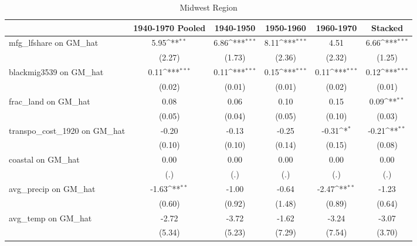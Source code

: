 \begin{table}[htbp]\centering
\def\sym#1{\ifmmode^{#1}\else\(^{#1}\)\fi}
\caption{Midwest Region}
\begin{tabular}{l*{5}{c}}
\toprule
                &\multicolumn{1}{c}{1940-1970 Pooled}&\multicolumn{1}{c}{1940-1950}&\multicolumn{1}{c}{1950-1960}&\multicolumn{1}{c}{1960-1970}&\multicolumn{1}{c}{Stacked}\\
\midrule
mfg\_lfshare on GM\_hat&     5.95\sym{**} &     6.86\sym{***}&     8.11\sym{***}&     4.51         &     6.66\sym{***}\\
                &   (2.27)         &   (1.73)         &   (2.36)         &   (2.32)         &   (1.25)         \\
\addlinespace
blackmig3539 on GM\_hat&     0.11\sym{***}&     0.11\sym{***}&     0.15\sym{***}&     0.11\sym{***}&     0.12\sym{***}\\
                &   (0.02)         &   (0.01)         &   (0.01)         &   (0.02)         &   (0.01)         \\
\addlinespace
frac\_land on GM\_hat&     0.08         &     0.06         &     0.10         &     0.15         &     0.09\sym{**} \\
                &   (0.05)         &   (0.04)         &   (0.05)         &   (0.10)         &   (0.03)         \\
\addlinespace
transpo\_cost\_1920 on GM\_hat&    -0.20         &    -0.13         &    -0.25         &    -0.31\sym{*}  &    -0.21\sym{**} \\
                &   (0.10)         &   (0.10)         &   (0.14)         &   (0.15)         &   (0.08)         \\
\addlinespace
coastal on GM\_hat&     0.00         &     0.00         &     0.00         &     0.00         &     0.00         \\
                &      (.)         &      (.)         &      (.)         &      (.)         &      (.)         \\
\addlinespace
avg\_precip on GM\_hat&    -1.63\sym{**} &    -1.00         &    -0.64         &    -2.47\sym{**} &    -1.23         \\
                &   (0.60)         &   (0.92)         &   (1.48)         &   (0.89)         &   (0.64)         \\
\addlinespace
avg\_temp on GM\_hat&    -2.72         &    -3.72         &    -1.62         &    -3.24         &    -3.07         \\
                &   (5.34)         &   (5.23)         &   (7.29)         &   (7.54)         &   (3.70)         \\

\end{tabular}
\end{table}

